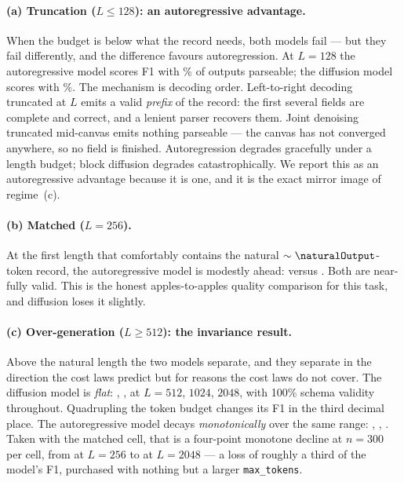 \paragraph{(a) Truncation ($L \le 128$): an autoregressive advantage.}
When the budget is below what the record needs, both models fail --- but they
fail differently, and the difference favours autoregression. At $L=128$ the
autoregressive model scores \arFOneOneTwoEight{} F1 with \arValidOneTwoEight\%
of outputs parseable; the diffusion model scores \dgFOneOneTwoEight{} with
\dgValidOneTwoEight\%. The mechanism is decoding order. Left-to-right decoding
truncated at $L$ emits a valid \emph{prefix} of the record: the first several
fields are complete and correct, and a lenient parser recovers them. Joint
denoising truncated mid-canvas emits nothing parseable --- the canvas has not
converged anywhere, so no field is finished. Autoregression degrades gracefully
under a length budget; block diffusion degrades catastrophically. We report this
as an autoregressive advantage because it is one, and it is the exact mirror
image of regime~(c).

\paragraph{(b) Matched ($L=256$).}
At the first length that comfortably contains the natural $\sim\naturalOutput$-token
record, the autoregressive model is modestly ahead: \arFOneTwoFiveSix{} versus
\dgFOneTwoFiveSix{}. Both are near-fully valid. This is the honest
apples-to-apples quality comparison for this task, and diffusion loses it
slightly.

\paragraph{(c) Over-generation ($L \ge 512$): the invariance result.}
Above the natural length the two models separate, and they separate in the
direction the cost laws predict but for reasons the cost laws do not cover. The
diffusion model is \emph{flat}: \dgFOneFiveTwelve{}, \dgFOneKiloOneK{},
\dgFOneTwoK{} at $L=512$, $1024$, $2048$, with 100\% schema validity throughout.
Quadrupling the token budget changes its F1 in the third decimal place. The
autoregressive model decays \emph{monotonically} over the same range:
\arFOneFiveTwelve{}, \arFOneKiloOneK{}, \arFOneTwoK{}. Taken with the matched
cell, that is a four-point monotone decline at $n=300$ per cell, from
\arFOneTwoFiveSix{} at $L=256$ to \arFOneTwoK{} at $L=2048$ --- a loss of
roughly a third of the model's F1, purchased with nothing but a larger
\texttt{max\_tokens}.

